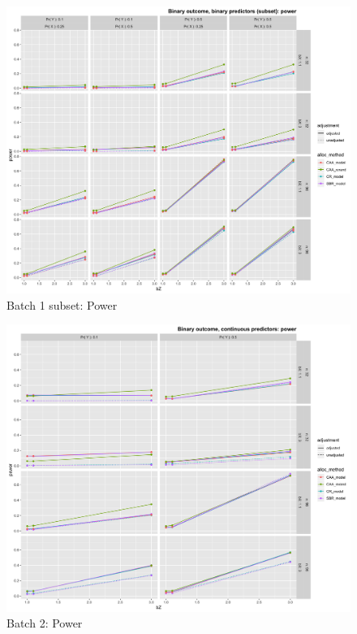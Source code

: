 \begin{figure}[H]
	\includegraphics[width=\linewidth]{figures/b1_sub_power_all_methods_adj_unadj}
	\caption{Batch 1 subset: Power}
	\label{fig:b1sp}
\end{figure}

\begin{figure}[H]
	\includegraphics[width=\linewidth]{figures/b2_power_all_methods_adj_unadj}
	\caption{Batch 2: Power}
	\label{fig:b2p}
\end{figure}

